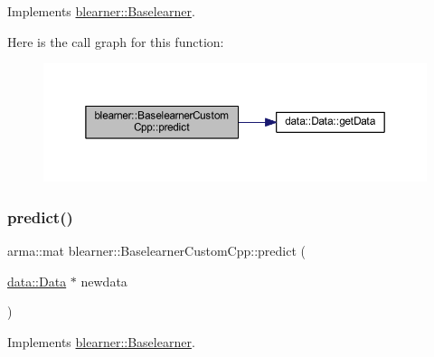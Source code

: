 Implements \mbox{\hyperlink{classblearner_1_1_baselearner_ab37986047db43c84420fef2cef7fc20d}{blearner\+::\+Baselearner}}.

Here is the call graph for this function\+:\nopagebreak
\begin{figure}[H]
\begin{center}
\leavevmode
\includegraphics[width=350pt]{classblearner_1_1_baselearner_custom_cpp_a88c17ed1e32255e482f34695e06e7d25_cgraph}
\end{center}
\end{figure}
\mbox{\label{classblearner_1_1_baselearner_custom_cpp_a55fb45a929fea01f79fa3dcad7698174}} 
\subsubsection{\texorpdfstring{predict()}{predict()}\hspace{0.1cm}{\footnotesize\ttfamily [2/2]}}
{\footnotesize\ttfamily arma\+::mat blearner\+::\+Baselearner\+Custom\+Cpp\+::predict (\begin{DoxyParamCaption}\item[{\mbox{\hyperlink{classdata_1_1_data}{data\+::\+Data}} $\ast$}]{newdata }\end{DoxyParamCaption})\hspace{0.3cm}{\ttfamily [virtual]}}



Implements \mbox{\hyperlink{classblearner_1_1_baselearner_ae2ef5e018783578e02b3b5a33fa94eae}{blearner\+::\+Baselearner}}.


